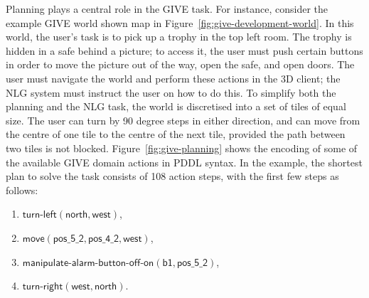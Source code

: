 Planning plays a central role in the GIVE task. For instance, consider the
example GIVE world shown map in Figure~\ref{fig:give-development-world}. In
this world, the user's task is to pick up a trophy in the top left room.
The trophy is hidden in a safe behind a picture; to access it, the user
must push certain buttons in order to move the picture out of the way, open
the safe, and open doors. The user must navigate the world and perform
these actions in the 3D client; the NLG system must instruct the user on
how to do this. To simplify both the planning and the NLG task, the world
is discretised into a set of tiles of equal size. The user can turn by 90
degree steps in either direction, and can move from the centre of one tile
to the centre of the next tile, provided the path between two tiles is not
blocked. Figure~\ref{fig:give-planning} shows the encoding of some of the
available GIVE domain actions in PDDL syntax. In the example, the shortest
plan to solve the task consists of 108 action steps, with the first few
steps as follows:
%
\begin{enumerate}
\item $\mathsf{turn}\textsf{-}\mathsf{left}(\mathsf{north},
\mathsf{west})$,
\item $\mathsf{move}(\mathsf{pos\_5\_2}, \mathsf{pos\_4\_2}, \mathsf{west})$,
\item $\mathsf{manipulate}\textsf{-}\mathsf{alarm}\textsf{-}\mathsf{button}\textsf{-}\mathsf{off}\textsf{-}\mathsf{on}(\mathsf{b1, pos\_5\_2})$,
\item $\mathsf{turn}\textsf{-}\mathsf{right}(\mathsf{west}, \mathsf{north})$.
\end{enumerate}

